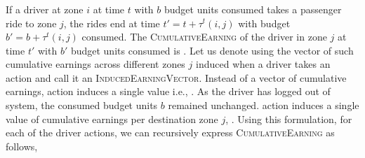 \subsubsection{}

If a driver at zone $i$ at time $t$ with $b$ budget units consumed takes a passenger ride to zone $j$, the rides end at time 
$t' = t + \tau^t(i,j)$ with budget $b' = b + \tau^t(i,j)$ consumed. The \textsc{CumulativeEarning} of the driver in zone $j$ at time $t'$ with $b'$
budget units consumed is . Let us denote using  the vector of such
cumulative earnings across different zones $j$ induced when a driver takes an action {\getpassengeraction} and call it an 
\textsc{InducedEarningVector}. Instead of a vector of cumulative earnings, {\gohome} action induces a single value i.e., . 
As the driver has logged out of system, the consumed budget units $b$ remained unchanged. {\relocate} action induces a single value of cumulative earnings per destination zone $j$, . 
Using this formulation, for each of the driver actions, we can recursively express \textsc{CumulativeEarning} as follows,

